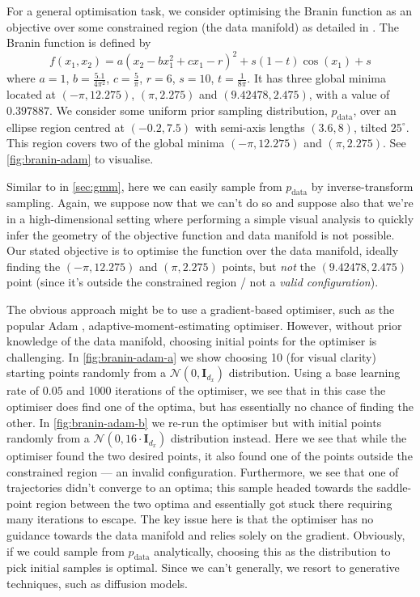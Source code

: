 For a general optimisation task, we consider optimising the Branin function as an objective over
some constrained region (the data manifold) as detailed in
\textcite{kongDiffusionModelsConstrained2024}. The Branin function is defined by
\begin{equation}
    f(x_1, x_2) = a(x_2 - bx_1^2 + cx_1 - r)^2 + s(1-t)\cos(x_1) + s \label{eq:branin}
\end{equation}
where $a=1$, $b = \frac{5.1}{4\pi^2}$, $c=\frac{5}{\pi}$, $r=6$, $s=10$, $t=\frac{1}{8\pi}$.
It has three global minima located at $(-\pi, 12.275)$, $(\pi, 2.275)$ and $(9.42478, 2.475)$,
with a value of $0.397887$. We consider some uniform prior sampling distribution, $p_{\text{data}}$,
over an ellipse region centred at $(-0.2, 7.5)$ with semi-axis lengths $(3.6, 8)$, tilted
$25^\circ$. This region covers two of the global minima $(-\pi, 12.275)$ and $(\pi, 2.275)$.
See \autoref{fig:branin-adam} to visualise.

Similar to in \autoref{sec:gmm}, here we can easily sample from $p_{\text{data}}$ by inverse-transform
sampling. Again, we suppose now that we can't do so and suppose also that we're in a high-dimensional
setting where performing a simple visual analysis to quickly infer the geometry of the objective
function and data manifold is not possible. Our stated objective is to optimise the function over
the data manifold, ideally finding the $(-\pi, 12.275)$ and $(\pi, 2.275)$ points, but \emph{not}
the $(9.42478, 2.475)$ point (since it's outside the constrained region / not a \emph{valid
configuration}).

The obvious approach might be to use a gradient-based optimiser, such as the popular
Adam \parencite{kingmaAdamMethodStochastic2017}, adaptive-moment-estimating optimiser. However,
without prior knowledge of the data manifold, choosing initial points for the optimiser is
challenging. In \autoref{fig:branin-adam-a} we show choosing 10 (for visual clarity) starting points
randomly from a $\mathcal{N}(0, \mathbf{I}_{d_x})$ distribution. Using a base learning rate of
$0.05$ and 1000 iterations of the optimiser, we see that in this case the optimiser does find one of
the optima, but has essentially no chance of finding the other. In \autoref{fig:branin-adam-b} we re-run
the optimiser but with initial points randomly from a $\mathcal{N}(0, 16\cdot\mathbf{I}_{d_x})$
distribution instead. Here we see that while the optimiser found the two desired points, it also found
one of the points outside the constrained region --- an invalid configuration. Furthermore, we see
that one of trajectories didn't converge to an optima; this sample headed towards the saddle-point
region between the two optima and essentially got stuck there requiring many iterations to escape.
The key issue here is that the optimiser has no guidance towards the data manifold and relies solely
on the gradient. Obviously, if we could sample from $p_{\text{data}}$ analytically, choosing this as
the distribution to pick initial samples is optimal. Since we can't generally, we resort to
generative techniques, such as diffusion models.

